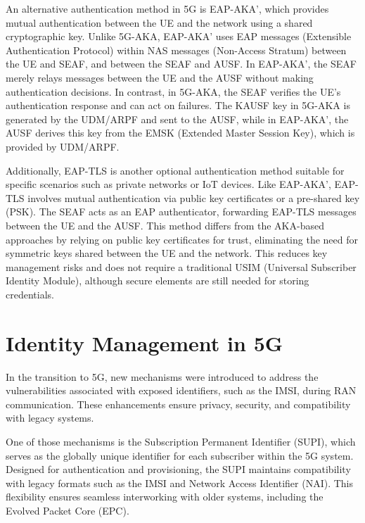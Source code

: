
An alternative authentication method in 5G is EAP-AKA', which provides mutual authentication between the UE and the network using a shared cryptographic key. Unlike 5G-AKA, EAP-AKA' uses EAP messages (Extensible Authentication Protocol) within NAS messages (Non-Access Stratum) between the UE and SEAF, and between the SEAF and AUSF. In EAP-AKA', the SEAF merely relays messages between the UE and the AUSF without making authentication decisions. In contrast, in 5G-AKA, the SEAF verifies the UE's authentication response and can act on failures. The KAUSF key in 5G-AKA is generated by the UDM/ARPF and sent to the AUSF, while in EAP-AKA', the AUSF derives this key from the EMSK (Extended Master Session Key), which is provided by UDM/ARPF.


Additionally, EAP-TLS is another optional authentication method suitable for specific scenarios such as private networks or IoT devices. Like EAP-AKA', EAP-TLS involves mutual authentication via public key certificates or a pre-shared key (PSK). The SEAF acts as an EAP authenticator, forwarding EAP-TLS messages between the UE and the AUSF. This method differs from the AKA-based approaches by relying on public key certificates for trust, eliminating the need for symmetric keys shared between the UE and the network. This reduces key management risks and does not require a traditional USIM (Universal Subscriber Identity Module), although secure elements are still needed for storing credentials.

\section{Identity Management in \acs{5G}} %

In the transition to \ac{5G}, new mechanisms were introduced to address the vulnerabilities associated with exposed identifiers, such as the \ac{IMSI}, during \ac{RAN} communication. These enhancements ensure privacy, security, and compatibility with legacy systems.

One of those mechanisms is the Subscription Permanent Identifier (SUPI), which serves as the globally unique identifier for each subscriber within the \ac{5G} system. Designed for authentication and provisioning, the SUPI maintains compatibility with legacy formats such as the IMSI and Network Access Identifier (NAI). This flexibility ensures seamless interworking with older systems, including the \ac{Evolved Packet Core (EPC)}.

